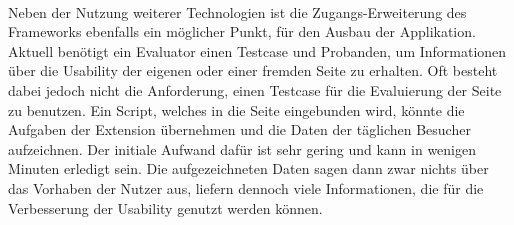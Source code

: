 \\
Neben der Nutzung weiterer Technologien ist die Zugangs-Erweiterung des Frameworks ebenfalls ein möglicher Punkt, für den Ausbau der Applikation. Aktuell benötigt ein Evaluator einen Testcase und Probanden, um Informationen über die Usability der eigenen oder einer fremden Seite zu erhalten. Oft besteht dabei jedoch nicht die Anforderung, einen Testcase für die Evaluierung der Seite zu benutzen. Ein Script, welches in die Seite eingebunden wird, könnte die Aufgaben der Extension übernehmen und die Daten der täglichen Besucher aufzeichnen. Der initiale Aufwand dafür ist sehr gering und kann in wenigen Minuten erledigt sein. Die aufgezeichneten Daten sagen dann zwar nichts über das Vorhaben der Nutzer aus, liefern dennoch viele Informationen, die für die Verbesserung der Usability genutzt werden können.